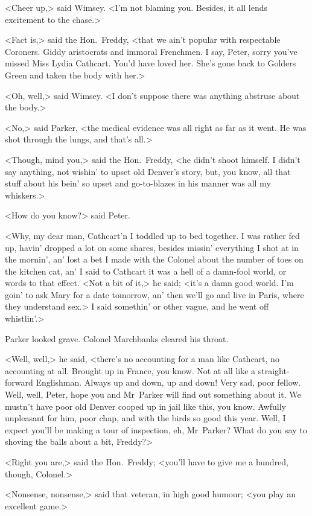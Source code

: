 <Cheer up,> said Wimsey. <I'm not blaming you. Besides, it all lends excitement to the chase.>

<Fact is,> said the Hon.~Freddy, <that we ain't popular with respectable Coroners. Giddy aristocrats and immoral Frenchmen. I say, Peter, sorry you've missed Miss Lydia Cathcart. You'd have loved her. She's gone back to Golders Green and taken the body with her.>

<Oh, well,> said Wimsey. <I don't suppose there was anything abstruse about the body.>

<No,> said Parker, <the medical evidence was all right as far as it went. He was shot through the lungs, and that's all.>

<Though, mind you,> said the Hon.~Freddy, <he didn't shoot himself. I didn't say anything, not wishin' to upset old Denver's story, but, you know, all that stuff about his bein' so upset and go-to-blazes in his manner was all my whiskers.>

<How do you know?> said Peter.

<Why, my dear man, Cathcart'n I toddled up to bed together. I was rather fed up, havin' dropped a lot on some shares, besides missin' everything I shot at in the mornin', an' lost a bet I made with the Colonel about the number of toes on the kitchen cat, an' I said to Cathcart it was a hell of a damn-fool world, or words to that effect. <Not a bit of it,> he said; <it's a damn good world. I'm goin' to ask Mary for a date tomorrow, an' then we'll go and live in Paris, where they understand sex.> I said somethin' or other vague, and he went off whistlin'.>

Parker looked grave. Colonel Marchbanks cleared his throat.

<Well, well,> he said, <there's no accounting for a man like Cathcart, no accounting at all. Brought up in France, you know. Not at all like a straight-forward Englishman. Always up and down, up and down! Very sad, poor fellow. Well, well, Peter, hope you and Mr~Parker will find out something about it. We mustn't have poor old Denver cooped up in jail like this, you know. Awfully unpleasant for him, poor chap, and with the birds so good this year. Well, I expect you'll be making a tour of inspection, eh, Mr~Parker? What do you say to shoving the balls about a bit, Freddy?>

<Right you are,> said the Hon.~Freddy; <you'll have to give me a hundred, though, Colonel.>

<Nonsense, nonsense,> said that veteran, in high good humour; <you play an excellent game.>

